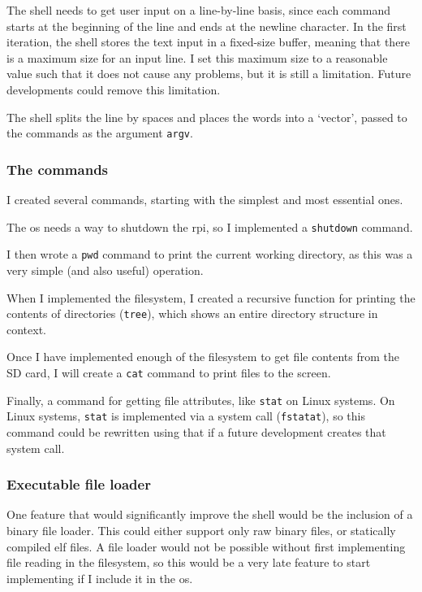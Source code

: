 \documentclass{article}
\begin{document}
The shell needs to get user input on a line-by-line basis, since each command
starts at the beginning of the line and ends at the newline character. In the
first iteration, the shell stores the text input in a fixed-size buffer,
meaning that there is a maximum size for an input line. I set this maximum size
to a reasonable value such that it does not cause any problems, but it is still
a limitation. Future developments could remove this limitation.

The shell splits the line by spaces and places the words into a `vector',
passed to the commands as the argument \texttt{argv}.

\subsubsection{The commands}
I created several commands, starting with the simplest and most essential
ones.

The \gls{os} needs a way to shutdown the \gls{rpi}, so I implemented a
\texttt{shutdown} command.

I then wrote a \texttt{pwd} command to print the current working directory, as
this was a very simple (and also useful) operation.

When I implemented the filesystem, I created a recursive function for
printing the contents of directories (\texttt{tree}), which shows an entire
directory structure in context.

Once I have implemented enough of the filesystem to get file contents from the
SD card, I will create a \texttt{cat} command to print files to the screen.

Finally, a command for getting file attributes, like \texttt{stat} on Linux
systems. On Linux systems, \texttt{stat} is implemented via a system call
(\texttt{fstatat}), so this command could be rewritten using that if a future
development creates that system call.

\subsubsection{Executable file loader}
One feature that would significantly improve the shell would be the inclusion
of a binary file loader. This could either support only raw binary files, or
statically compiled \gls{elf} files. A file loader would not be possible
without first implementing file reading in the filesystem, so this would be a
very late feature to start implementing if I include it in the \gls{os}.
\end{document}

